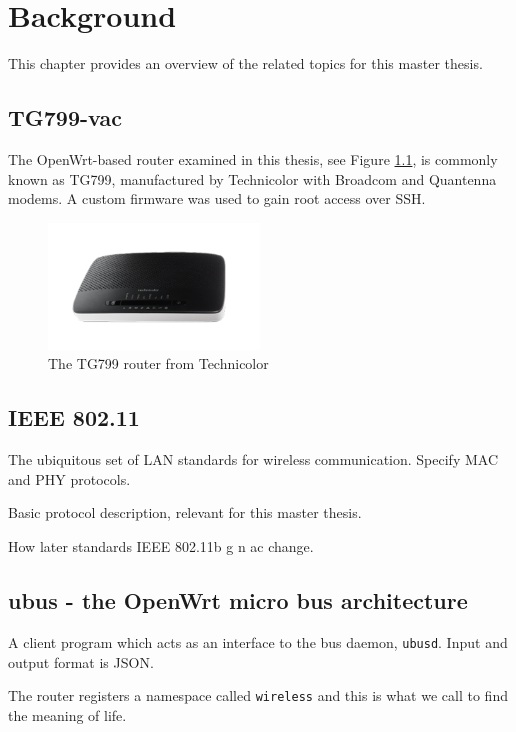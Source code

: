 \chapter{Background}

This chapter provides an overview of the related topics for this master thesis.

\section{TG799-vac}

The OpenWrt-based router examined in this thesis, see Figure \ref{fig:tg799}, is commonly known as TG799, manufactured by Technicolor with Broadcom and Quantenna modems. A custom firmware was used to gain root access over SSH.

\begin{figure}
\center
\includegraphics[width=0.5\textwidth]{images/tg799.png}
\caption{The TG799 router from Technicolor}
\label{fig:tg799}
\end{figure}

\section{IEEE 802.11}

The ubiquitous set of LAN standards for wireless communication. Specify MAC and PHY protocols.

Basic protocol description, relevant for this master thesis.

How later standards IEEE 802.11b g n ac change.

\section{ubus - the OpenWrt micro bus architecture}

A client program which acts as an interface to the bus daemon, \texttt{ubusd}. Input and output format is JSON.

The router registers a namespace called \texttt{wireless} and this is what we call to find the meaning of life.

